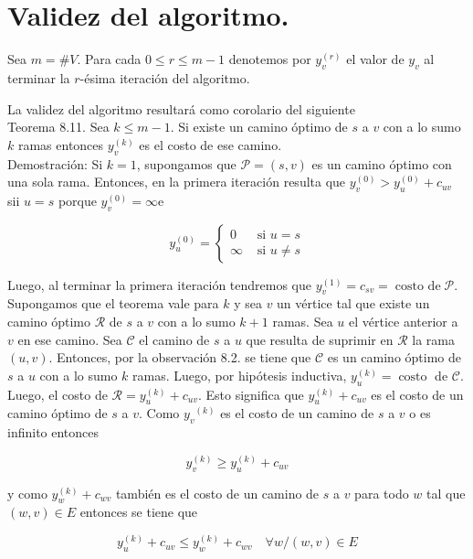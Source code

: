 \documentclass[10pt]{article}
\begin{document}
\section*{Validez del algoritmo.}
Sea $m=\# V$. Para cada $0 \leq r \leq m-1$ denotemos por $y_{v}^{(r)}$ el valor de $y_{v}$ al terminar la $r$-ésima iteración del algoritmo.

La validez del algoritmo resultará como corolario del siguiente\\
Teorema 8.11. Sea $k \leq m-1$. Si existe un camino óptimo de $s$ a $v$ con a lo sumo $k$ ramas entonces $y_{v}^{(k)}$ es el costo de ese camino.\\
Demostración: Si $k=1$, supongamos que $\mathcal{P}=(s, v)$ es un camino óptimo con una sola rama. Entonces, en la primera iteración resulta que $y_{v}^{(0)}>y_{u}^{(0)}+c_{u v}$ sii $u=s$ porque $y_{v}^{(0)}=\infty \mathrm{e}$

$$
y_{u}^{(0)}= \begin{cases}0 & \text { si } u=s \\ \infty & \text { si } u \neq s\end{cases}
$$

Luego, al terminar la primera iteración tendremos que $y_{v}^{(1)}=c_{s v}=\operatorname{costo~de} \mathcal{P}$.\\
Supongamos que el teorema vale para $k$ y sea $v$ un vértice tal que existe un camino óptimo $\mathcal{R}$ de $s$ a $v$ con a lo sumo $k+1$ ramas. Sea $u$ el vértice anterior a $v$ en ese camino. Sea $\mathcal{C}$ el camino de $s$ a $u$ que resulta de suprimir en $\mathcal{R}$ la rama $(u, v)$. Entonces, por la observación 8.2. se tiene que $\mathcal{C}$ es un camino óptimo de $s$ a $u$ con a lo sumo $k$ ramas. Luego, por hipótesis inductiva, $y_{u}^{(k)}=\operatorname{costo}$ de $\mathcal{C}$.\\
Luego, el costo de $\mathcal{R}=y_{u}^{(k)}+c_{u v}$. Esto significa que $y_{u}^{(k)}+c_{u v}$ es el costo de un camino óptimo de $s$ a $v$. Como $y_{v}{ }^{(k)}$ es el costo de un camino de $s$ a $v$ o es infinito entonces


\begin{equation*}
y_{v}^{(k)} \geq y_{u}^{(k)}+c_{u v} \tag{1}
\end{equation*}


y como $y_{w}^{(k)}+c_{w v}$ también es el costo de un camino de $s$ a $v$ para todo $w$ tal que $(w, v) \in E$ entonces se tiene que


\begin{equation*}
y_{u}^{(k)}+c_{u v} \leq y_{w}^{(k)}+c_{w v} \quad \forall w /(w, v) \in E \tag{2}
\end{equation*}
\end{document}
